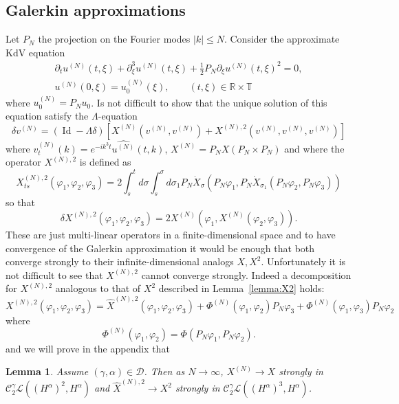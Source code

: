 \documentclass[a4paper,12pt,reqno]{article}
\newcommand{\der}{\delta}
\newcommand{\RR}{\mathbb{R}}
\newcommand{\TT}{\mathbb{T}}
\newcommand{\CC}{\mathcal{C}}
\newcommand{\DD}{\mathcal{D}}
\newcommand{\LL}{\mathcal{L}}
\newcommand{\wh}{\widehat}
\DeclareMathOperator{\id}{\text{Id}}
\newtheorem{lemma}[theorem]{Lemma}
\begin{document}
\subsection{Galerkin approximations}
\label{sec:galerkin}
Let $P_N$ the projection on the Fourier modes $|k| \le N$. Consider the approximate KdV equation
\begin{multline}
  \label{eq:kdv-real-N}
\partial_t u^{(N)}(t,\xi) + \partial^3_\xi u^{(N)}(t,\xi) +
\frac12 P_N \partial_\xi u^{(N)}(t,\xi)^2 = 0,\\ u^{(N)}(0,\xi) = u^{(N)}_0(\xi), \qquad
(t,\xi)\in\RR\times \TT  
\end{multline}
where $u^{(N)}_0 = P_N u_0$. Is not difficult to show that the unique solution of this equation satisfy the $\Lambda$-equation
\begin{equation}
  \label{eq:abs-step-2-compact-N}
\der v^{(N)} = (\id - \Lambda \der)[X^{(N)}(v^{(N)},v^{(N)})+X^{(N),2}(v^{(N)},v^{(N)},v^{(N)})]
\end{equation}
where $v^{(N)}_t(k) = e^{-ik^3 t}\wh{u^{(N)}}(t,k)$,
$X^{(N)} = P_N X ( P_N \times P_N )$ and where the operator $X^{(N),2}$ is defined as
\begin{equation}
  \label{eq:X2-galerkin}
X^{(N),2}_{ts}(\varphi_1,\varphi_2,\varphi_3) = 2 \int_s^t d\sigma \int_s^\sigma d\sigma_1 P_N \dot X_\sigma(P_N \varphi_1,P_N \dot X_{\sigma_1}(P_N \varphi_2,P_N \varphi_3))  
\end{equation}
so that 
$$
\der X^{(N),2}(\varphi_1,\varphi_2,\varphi_3) = 2 X^{(N)}(\varphi_1,X^{(N)}(\varphi_2,\varphi_3)).
$$
These are just multi-linear operators in
a finite-dimensional space and to have convergence of the Galerkin
approximation it would be enough that both converge strongly to their
infinite-dimensional analogs $X,X^2$. Unfortunately it is not difficult to see that $X^{(N),2}$ cannot converge strongly.
 Indeed a
decomposition for   $X^{(N),2}$ analogous to that of $X^2$ described
in Lemma~\ref{lemma:X2} holds:
\begin{equation}
  \label{eq:decomp-gal}
X^{(N),2}(\varphi_1,\varphi_2,\varphi_3) = \hat X^{(N),2}(\varphi_1,\varphi_2,\varphi_3) + \Phi^{(N)}(\varphi_1,\varphi_2) P_N\varphi_3 + \Phi^{(N)}(\varphi_1,\varphi_3)P_N \varphi_2  
\end{equation}
where 
$$
\Phi^{(N)}(\varphi_1,\varphi_2) = \Phi(P_N \varphi_1,P_N \varphi_2).
$$
and we will prove in the appendix that 
\begin{lemma}
\label{lemma:gal}
Assume $(\gamma,\alpha) \in \DD$. Then as  $N \to \infty$, $X^{(N)} \to X$ strongly in $\CC_2^\gamma
\LL((H^\alpha)^2,H^\alpha)$ and $\hat X^{(N),2} \to X^2$ strongly in $\CC_2^\gamma
\LL((H^\alpha)^3,H^\alpha)$. 
\end{lemma}
\end{document}
